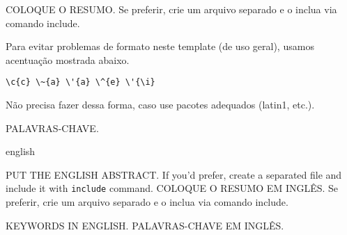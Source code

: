 \documentclass[bsc, classic, a4paper]{ufbathesis}
\begin{document}
\resumo
COLOQUE O RESUMO. Se preferir, crie um arquivo separado e o inclua via comando include.

Para evitar problemas de formato neste template (de uso geral), usamos acentua\c{c}\~{a}o mostrada abaixo. 

\begin{verbatim} 
\c{c} \~{a} \'{a} \^{e} \'{\i}
\end{verbatim} 

N\~{a}o precisa fazer dessa forma, caso use pacotes adequados (latin1, etc.).

\begin{keywords}
PALAVRAS-CHAVE.
\end{keywords}


\begin{otherlanguage*}{english}
\abstract

PUT THE ENGLISH ABSTRACT. If you'd prefer, create a separated file and include it with \texttt{include} command.
COLOQUE O RESUMO EM INGL\^{E}S. Se preferir, crie um arquivo separado e o inclua via comando include.
\begin{keywords}
KEYWORDS IN ENGLISH.
PALAVRAS-CHAVE EM INGL\^{E}S.
\end{keywords}
\end{otherlanguage*}


\tableofcontents

\listoffigures

\listoftables

\abbreviations
\begin{acronym}[PGCOMP]
\end{acronym}

\mainmatter

% 
% 
% 
%
\end{document}
